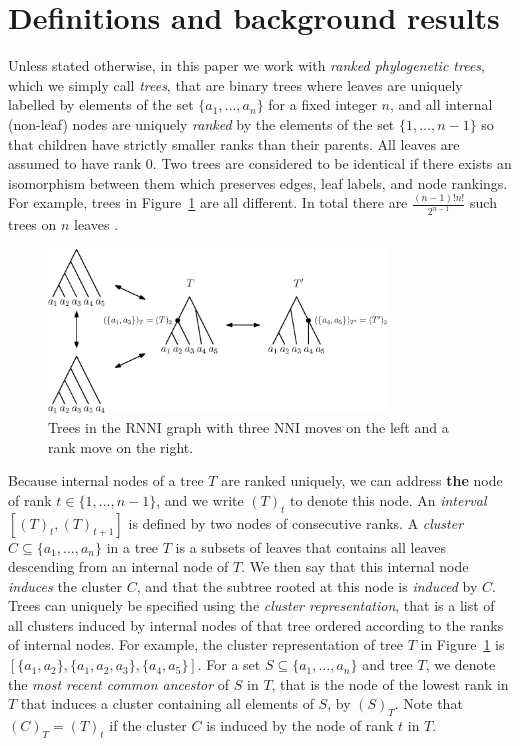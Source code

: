 \documentclass[11pt]{amsart}
\newcommand{\rnni}{\mathrm{RNNI}}
\newcommand{\nni}{\mathrm{NNI}}
\newcommand{\summary}[1]{} %
\begin{document}
\section{Definitions and background results}

\summary{Defining ranked trees and clusters.}
Unless stated otherwise, in this paper we work with \emph{ranked phylogenetic trees}, which we simply call \emph{trees}, that are binary trees where leaves are uniquely labelled by elements of the set $\{a_1, \ldots, a_n\}$ for a fixed integer $n$, and all internal (non-leaf) nodes are uniquely \emph{ranked} by the elements of the set $\{1, \ldots, n-1\}$ so that children have strictly smaller ranks than their parents.
All leaves are assumed to have rank $0$.
Two trees are considered to be identical if there exists an isomorphism between them which preserves edges, leaf labels, and node rankings.
For example, trees in Figure~\ref{fig:ranked_trees_ex} are all different.
In total there are $\frac{(n - 1)! n!}{2^{n-1}}$ such trees on $n$ leaves \autocite{Gavryushkin2018-ol}.

\begin{figure}[ht]
\centering
\includegraphics[width=0.8\textwidth]{ranked_trees_ex}
\caption{Trees in the $\rnni$ graph with three $\nni$ moves on the left and a rank move on the right.}
\label{fig:ranked_trees_ex}
\end{figure}

Because internal nodes of a tree $T$ are ranked uniquely, we can address \textbf{the} node of rank $t \in \{1, \ldots, n - 1\}$, and we write $(T)_t$ to denote this node.
An \emph{interval} $[(T)_t,(T)_{t+1}]$ is defined by two nodes of consecutive ranks.
A \emph{cluster} $C \subseteq \{a_1, \ldots, a_n\}$ in a tree $T$ is a subsets of leaves that contains all leaves descending from an internal node of $T$.
We then say that this internal node \emph{induces} the cluster $C$, and that the subtree rooted at this node is \emph{induced} by $C$.
Trees can uniquely be specified using the \emph{cluster representation}, that is a list of all clusters induced by internal nodes of that tree ordered according to the ranks of internal nodes.
For example, the cluster representation of tree $T$ in Figure~\ref{fig:ranked_trees_ex} is $[\{a_1, a_2\}, \{a_1, a_2, a_3\}, \{a_4, a_5\}]$.
For a set $S \subseteq \{a_1, \ldots, a_n\}$ and tree $T$, we denote the \emph{most recent common ancestor} of $S$ in $T$, that is the node of the lowest rank in $T$ that induces a cluster containing all elements of $S$, by $(S)_T$.
Note that $(C)_T = (T)_t$ if the cluster $C$ is induced by the node of rank $t$ in $T$.
\end{document}
